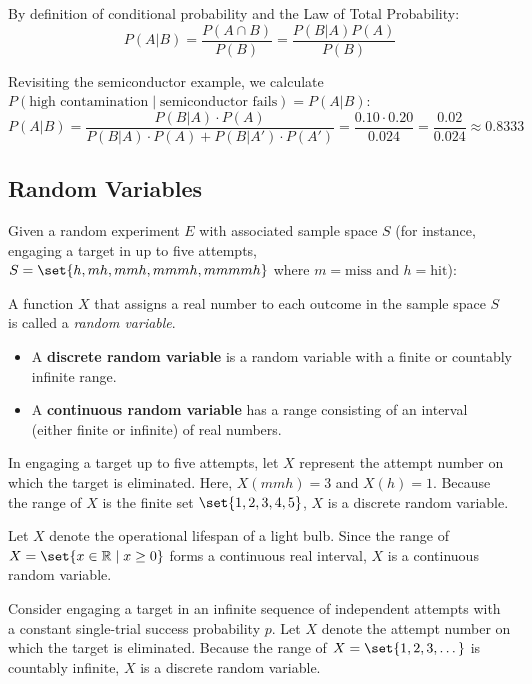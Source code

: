 By definition of conditional probability and the Law of Total Probability:
\[
    P(A|B) = \frac{P(A \cap B)}{P(B)} = \frac{P(B|A)P(A)}{P(B)}
\]

\begin{example}
    Revisiting the semiconductor example, we calculate $P(\text{high contamination} \mid \text{semiconductor fails}) = P(A|B)$:
    \[
        P(A|B) = \frac{P(B|A) \cdot P(A)}{P(B|A) \cdot P(A) + P(B|A') \cdot P(A')} = \frac{0.10 \cdot 0.20}{0.024} = \frac{0.02}{0.024} \approx \mathbf{0.8333}
    \]
\end{example}

\subsection*{Random Variables}

Given a random experiment $E$ with associated sample space $S$ (for instance, engaging a target in up to five attempts, $S = \set{h, mh, mmh, mmmh, mmmmh}$ where $m = \text{miss}$ and $h = \text{hit}$):

\begin{definition}
    A function $X$ that assigns a real number to each outcome in the sample space $S$ is called a \emph{random variable}.
    \begin{itemize}\setlength\itemsep{0.5em}
        \item A \textbf{discrete random variable} is a random variable with a finite or countably infinite range.
        \item A \textbf{continuous random variable} has a range consisting of an interval (either finite or infinite) of real numbers.
    \end{itemize}
\end{definition}

\begin{example}
    In engaging a target up to five attempts, let $X$ represent the attempt number on which the target is eliminated.
    Here, $X(mmh) = 3$ and $X(h) = 1$.
    Because the range of $X$ is the finite set $\set{1, 2, 3, 4, 5}$, $X$ is a discrete random variable.
\end{example}

\begin{example}
    Let $X$ denote the operational lifespan of a light bulb.
    Since the range of $X = \set{x \in \mathbb{R} \mid x \ge 0}$ forms a continuous real interval, $X$ is a continuous random variable.
\end{example}

\begin{example}
    Consider engaging a target in an infinite sequence of independent attempts with a constant single-trial success probability $p$.
    Let $X$ denote the attempt number on which the target is eliminated.
    Because the range of $X = \set{1, 2, 3, \dots}$ is countably infinite, $X$ is a discrete random variable.
\end{example}